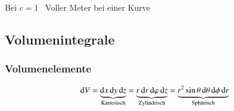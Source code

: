 Bei $c = 1$ \textrightarrow\ Voller Meter bei einer Kurve %



\subsection{Volumenintegrale}
\subsubsection{Volumenelemente}
$$ 
 \diff V 
    = \underbrace{\diff x \diff y \diff z}_{\text{Kartesisch}}
    = \underbrace{r \diff r \diff \varphi \diff z}_{\text{Zylindrisch}}
    = \underbrace{r^2 \sin \theta \diff \theta \diff \phi \diff r}_{\text{Sphärisch}}
$$


